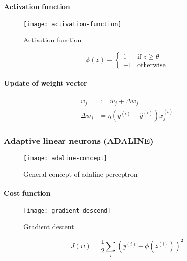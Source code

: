\documentclass{article}
\begin{document}
			\paragraph{Activation function}

			\begin{figure}
				\centering
				\texttt{[image: activation-function]}
				\caption{Activation function}
				\label{fig:activation-function}
			\end{figure}

			\begin{equation}
				\phi(z) = \begin{cases}
					1 &\mbox{if } z \geq \theta \\
					-1 &\mbox{otherwise}
				\end{cases}
			\end{equation}

			\paragraph{Update of weight vector}

			\begin{align}
					w_j &:= w_j + \Delta w_j \\
					\Delta w_j &= \eta(y^{(i)} - \hat{y}^{(i)}) x^{(i)}_j
			\end{align}

			\subsubsection{Adaptive linear neurons (ADALINE)}

			\begin{figure}
				\centering
				\texttt{[image: adaline-concept]}
				\caption{General concept of adaline perceptron}
				\label{fig:adaline-concept}
			\end{figure}

			\paragraph{Cost function}

			\begin{figure}
				\centering
				\texttt{[image: gradient-descend]}
				\caption{Gradient descent}
				\label{fig:gradient-descend}
			\end{figure}

			\begin{equation}
				J(w) = \frac{1}{2} \sum_i (y^{(i)}-\phi(z^{(i)}))^2
			\end{equation}
\end{document}
